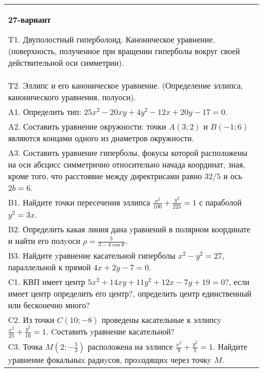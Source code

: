 \documentclass{article}
\begin{document}
\begin{tabular}{m{17cm}}
\textbf{27-вариант}
\newline

T1. Двуполостный гиперболоид. Каноническое уравнение. (поверхность, полученное при вращении гиперболы вокруг своей действительной оси симметрии).\\

T2. Эллипс и его каноническое уравнение. (Определение эллипса, канонического уравнения, полуоси).\\

A1. Определить тип: $25x^{2}-20xy+4y^{2}-12x+20y-17=0$.\\

A2. Составить уравнение окружности: точки $A(3;2)$ и $B(-1;6)$ являются концами одного из днаметров окружности.\\

A3. Составить уравнение гиперболы, фокусы которой расположены на оси абсцисс симметрично относительно начада координат, зная, кроме того, что расстоявие между директрисами равно $32/5$ и ось $2b=6$.\\

B1. Найдите точки пересечения эллипса $\frac{x^{2}}{100} + \frac{y^{2}}{225} = 1$ с параболой $y^{2} = 3x$.\\

B2. Определить какая линия дана yравнений в полярном координате и найти его полyоси $\rho = \frac{5}{3 - 4\cos\theta}$.  \\

B3. Найдите yравнение касательной гиперболы $x^{2} - y^{2} = 27$, параллельной к прямой $4x + 2y - 7 = 0$.  \\

C1. КВП имеет центр $5x^{2}+14xy+11y^{2}+12x-7y+19=0$?, если имеет центр определить его центр?, определить центр единственный или бесконечно много?  \\

C2. Из точки $C(10;-8)$ проведены касательные к эллипсy $\frac{x^{2}}{25}+\frac{y^{2}}{16}=1$. Cоставить yравнение касательной?  \\

C3. Точка $M(2;-\frac{5}{3})$ расположена на эллипсе $\frac{x^{2}}{9}+\frac{y^{2}}{5}=1$. Найдите yравнение фокальныx радиyсов, проxодящиx через точкy $M$.  \\

\end{tabular}
\vspace{1cm}
\end{document}
